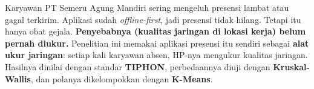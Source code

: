 


\begin{intinya}
Karyawan PT Semeru Agung Mandiri sering mengeluh presensi lambat atau gagal terkirim. Aplikasi sudah \textit{offline-first}, jadi presensi tidak hilang. Tetapi itu hanya obat gejala. \textbf{Penyebabnya (kualitas jaringan di lokasi kerja) belum pernah diukur.}
Penelitian ini memakai aplikasi presensi itu sendiri sebagai \textbf{alat ukur jaringan}: setiap kali karyawan absen, HP-nya mengukur kualitas jaringan. Hasilnya dinilai dengan standar \textbf{TIPHON}, perbedaannya diuji dengan \textbf{Kruskal-Wallis}, dan polanya dikelompokkan dengan \textbf{K-Means}.
\end{intinya}

